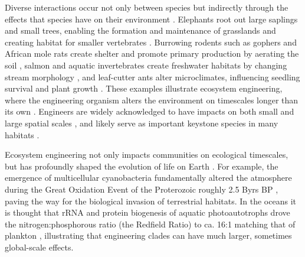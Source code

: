 \documentclass[twocolumn,preprintnumbers,amsmath,amssymb,superscriptaddress,linenumbers]{revtex4-1}
\begin{document}
\begin{bibunit}
Diverse interactions occur not only between species but indirectly through the effects that species have on their environment \cite{Jones1994,Olff2009,OdlingSmee2013}.
Elephants root out large saplings and small trees, enabling the formation and maintenance of grasslands \cite{Leuthold1996,Haynes2012} and creating habitat for smaller vertebrates \cite{Pringle2008}.
Burrowing rodents such as gophers and African mole rats create shelter and promote primary production by aerating the soil \cite{Reichman2002,Hagenah2013}, salmon and aquatic invertebrates create freshwater habitats by changing stream morphology \cite{Moore2006}, and leaf-cutter ants alter microclimates, influencing seedling survival and plant growth \cite{Meyer2011}.
These examples illustrate ecosystem engineering, where the engineering organism alters the environment on timescales longer than its own \cite{Hastings2007}.
Engineers are widely acknowledged to have impacts on both small and large spatial scales \cite{Wright2006b}, and likely serve as important keystone species in many habitats \cite{Jones2012}.

Ecosystem engineering not only impacts communities on ecological timescales, but has profoundly shaped the evolution of life on Earth \cite{Erwin2008}.
For example, the emergence of multicellular cyanobacteria fundamentally altered the atmosphere during the Great Oxidation Event of the Proterozoic roughly 2.5 Byrs BP \cite{Erwin2008,Schirrmeister2013}, paving the way for the biological invasion of terrestrial habitats.
In the oceans it is thought that rRNA and protein biogenesis of aquatic photoautotrophs drove the nitrogen:phosphorous ratio (the Redfield Ratio) to ca. 16:1 matching that of plankton \cite{Loladze2011}, illustrating that engineering clades can have much larger, sometimes global-scale effects.




\end{bibunit}
\end{document}
